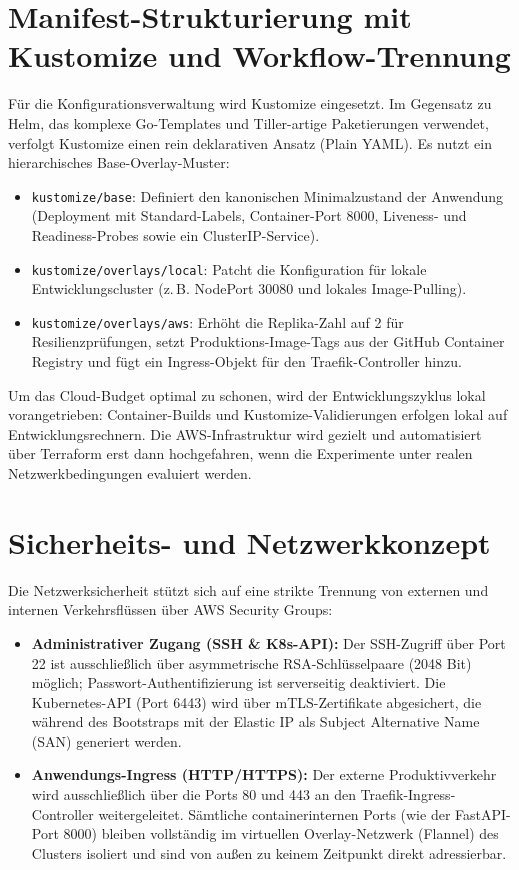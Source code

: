 \section{Manifest-Strukturierung mit Kustomize und Workflow-Trennung}
\label{sec:kustomize-manifestverwaltung}
Für die Konfigurationsverwaltung wird Kustomize eingesetzt. Im Gegensatz zu Helm, das komplexe Go-Templates und Tiller-artige Paketierungen verwendet, verfolgt Kustomize einen rein deklarativen Ansatz (Plain YAML). Es nutzt ein hierarchisches Base-Overlay-Muster:
\begin{itemize}[noitemsep,topsep=2pt]
    \item \texttt{kustomize/base}: Definiert den kanonischen Minimalzustand der Anwendung (Deployment mit Standard-Labels, Container-Port 8000, Liveness- und Readiness-Probes sowie ein ClusterIP-Service).
    \item \texttt{kustomize/overlays/local}: Patcht die Konfiguration für lokale Entwicklungscluster (z.\,B. NodePort 30080 und lokales Image-Pulling).
    \item \texttt{kustomize/overlays/aws}: Erhöht die Replika-Zahl auf 2 für Resilienzprüfungen, setzt Produktions-Image-Tags aus der GitHub Container Registry und fügt ein Ingress-Objekt für den Traefik-Controller hinzu.
\end{itemize}

Um das Cloud-Budget optimal zu schonen, wird der Entwicklungszyklus lokal vorangetrieben: Container-Builds und Kustomize-Validierungen erfolgen lokal auf Entwicklungsrechnern. Die AWS-Infrastruktur wird gezielt und automatisiert über Terraform erst dann hochgefahren, wenn die Experimente unter realen Netzwerkbedingungen evaluiert werden.

\section{Sicherheits- und Netzwerkkonzept}
\label{sec:sicherheitskonzept}
Die Netzwerksicherheit stützt sich auf eine strikte Trennung von externen und internen Verkehrsflüssen über AWS Security Groups:
\begin{itemize}[noitemsep,topsep=2pt]
    \item \textbf{Administrativer Zugang (SSH \& K8s-API):} Der SSH-Zugriff über Port 22 ist ausschließlich über asymmetrische RSA-Schlüsselpaare (2048 Bit) möglich; Passwort-Authentifizierung ist serverseitig deaktiviert. Die Kubernetes-API (Port 6443) wird über mTLS-Zertifikate abgesichert, die während des Bootstraps mit der Elastic IP als Subject Alternative Name (SAN) generiert werden.
    \item \textbf{Anwendungs-Ingress (HTTP/HTTPS):} Der externe Produktivverkehr wird ausschließlich über die Ports 80 und 443 an den Traefik-Ingress-Controller weitergeleitet. Sämtliche containerinternen Ports (wie der FastAPI-Port 8000) bleiben vollständig im virtuellen Overlay-Netzwerk (Flannel) des Clusters isoliert und sind von außen zu keinem Zeitpunkt direkt adressierbar.
\end{itemize}
